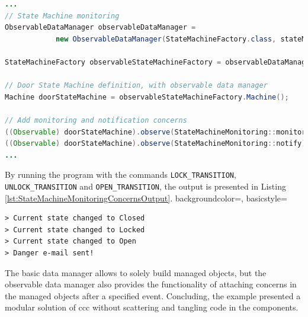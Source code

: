 \begin{sourcecode} [H]
	\begin{lstlisting}[language=Java, escapechar=|]
...
// State Machine monitoring
ObservableDataManager observableDataManager = 
			new ObservableDataManager(StateMachineFactory.class, stateMachineSchema);

StateMachineFactory observableStateMachineFactory = observableDataManager.make();

// Door State Machine definition, with observable data manager
Machine doorStateMachine = observableStateMachineFactory.Machine();

// Add monitoring and notification concerns
((Observable) doorStateMachine).observe(StateMachineMonitoring::monitor); |\label{line:state_machine_monitor}|
((Observable) doorStateMachine).observe(StateMachineMonitoring::notify);  |\label{line:state_machine_notify}|
...
	\end{lstlisting}
	\caption{Door state machine with concerns}
	\label{lst:StateMachineMonitoringConcerns}
\end{sourcecode}

By running the program with the commands \texttt{LOCK\_TRANSITION}, \texttt{UNLOCK\_TRANSITION} and \texttt{OPEN\_TRANSITION}, the output is presented in Listing \ref{lst:StateMachineMonitoringConcernsOutput}.
 {
    backgroundcolor=\color{white},
    basicstyle=\scriptsize\color{black}\ttfamily
}

\begin{sourcecode} [H]
	\lstset{numbers=none}
	\begin{lstlisting}[style=Bash]
> Current state changed to Closed
> Current state changed to Locked
> Current state changed to Open
> Danger e-mail sent!
	\end{lstlisting}
	\caption{Door state machine with concerns: output}
	\label{lst:StateMachineMonitoringConcernsOutput}
\end{sourcecode}

The basic data manager allows to solely build managed objects, but the observable data manager also provides the functionality of attaching concerns in the managed objects after a specified event.
Concluding, the example presented a modular solution of \ac{ccc} without scattering and tangling code in the components.
